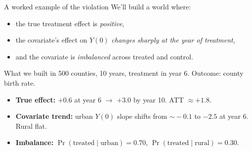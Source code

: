 \documentclass[aspectratio=169,11pt]{beamer}
\begin{document}

\begin{frame}{A worked example of the violation}
\vspace{0.8em}
We'll build a world where:
\begin{itemize}\setlength\itemsep{0.6em}
  \item the true treatment effect is \textit{positive},
  \item the covariate's effect on $Y(0)$ \textit{changes sharply at the year of treatment},
  \item and the covariate is \textit{imbalanced} across treated and control.
\end{itemize}

\vspace{0.8em}
\begin{center}
\end{center}
\end{frame}

\begin{frame}{What we built in}
\vspace{0.5em}
500 counties, 10 years, treatment in year 6. \;Outcome: \;county birth rate.

\vspace{0.8em}
\begin{itemize}\setlength\itemsep{0.6em}
  \item \textbf{True effect:} \;$+0.6$ at year 6 $\to$ $+3.0$ by year 10. \;ATT $\approx +1.8$.
  \item \textbf{Covariate trend:} \;urban $Y(0)$ slope shifts from $\sim\!-0.1$ to $-2.5$ at year 6. \;Rural flat.
  \item \textbf{Imbalance:} \;$\Pr(\text{treated} \mid \text{urban}) = 0.70$, \;$\Pr(\text{treated} \mid \text{rural}) = 0.30$.
\end{itemize}

\vspace{0.8em}
\begin{center}
\end{center}
\end{frame}
\end{document}
